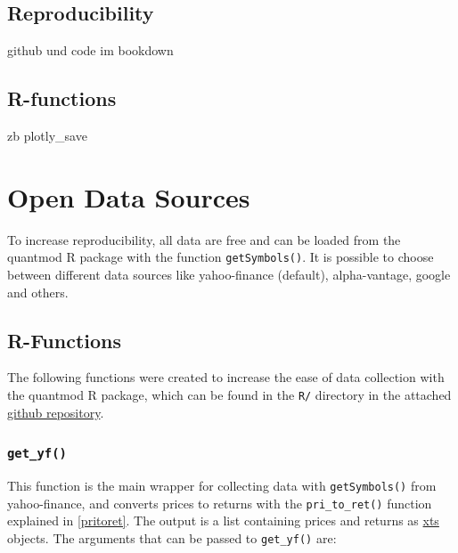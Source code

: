 \documentclass[
  oneside]{book}
\begin{document}
\hypertarget{reproducibility}{%
\section{Reproducibility}\label{reproducibility}}

github und code im bookdown

\hypertarget{r-functions}{%
\section{R-functions}\label{r-functions}}

zb plotly\_save

\hypertarget{open-data-sources}{%
\chapter{Open Data Sources}\label{open-data-sources}}

To increase reproducibility, all data are free and can be loaded from the quantmod R package with the function \texttt{getSymbols()}. It is possible to choose between different data sources like yahoo-finance (default), alpha-vantage, google and others.

\hypertarget{r-functions-1}{%
\section{R-Functions}\label{r-functions-1}}

The following functions were created to increase the ease of data collection with the quantmod R package, which can be found in the \texttt{R/} directory in the attached \href{https://github.com/AxelCode-R/Master-Thesis}{github repository}.

\hypertarget{get_yf}{%
\subsection{\texorpdfstring{\texttt{get\_yf()}}{get\_yf()}}\label{get_yf}}

This function is the main wrapper for collecting data with \texttt{getSymbols()} from yahoo-finance, and converts prices to returns with the \texttt{pri\_to\_ret()} function explained in \ref{pritoret}. The output is a list containing prices and returns as \href{https://cran.r-project.org/web/packages/xts/xts.pdf}{xts} objects. The arguments that can be passed to \texttt{get\_yf()} are:

\vspace{-0.4cm}
\end{document}

